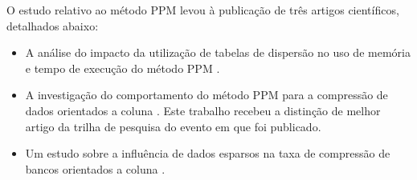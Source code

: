 \documentclass[a4paper,12pt,oneside]{article}
\let\cite\citep
\begin{document}
O estudo relativo ao método PPM levou à publicação de três artigos científicos, detalhados abaixo:

\begin{itemize}
	\item A análise do impacto da utilização de tabelas de dispersão no uso de memória e tempo de execução do método PPM \cite{Garcia:2016}.
	\item A investigação do comportamento do método PPM para a compressão de dados orientados a coluna \cite{Garcia2:2016}. Este trabalho recebeu a distinção de melhor artigo da trilha de pesquisa do evento em que foi publicado.
	\item Um estudo sobre a influência de dados esparsos na taxa de compressão de bancos orientados a coluna \cite{Garcia3:2016}.
\end{itemize}





\end{document}
